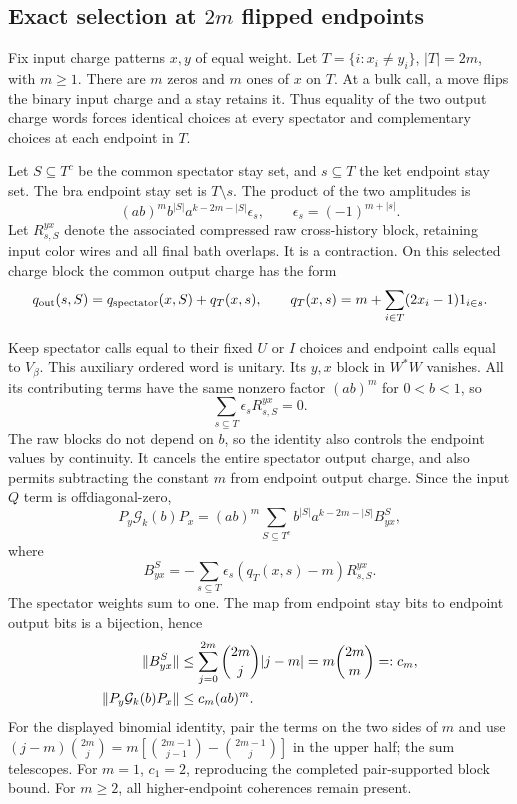 \subsection{Exact selection at $2m$ flipped endpoints}

Fix input charge patterns $x,y$ of equal weight. Let
$T=\{i:x_i\ne y_i\}$, $|T|=2m$, with $m\ge1$.
There are $m$ zeros and $m$ ones of $x$ on $T$.
At a bulk call, a move flips the binary input charge and a stay retains it.
Thus equality of the two output charge words forces identical choices
at every spectator and complementary choices at each endpoint in $T$.

Let $S\subseteq T^c$ be the common spectator stay set, and
$s\subseteq T$ the ket endpoint stay set. The bra endpoint stay set is
$T\setminus s$. The product of the two amplitudes is
\[
 (ab)^m b^{|S|}a^{k-2m-|S|}\epsilon_s,
 \qquad \epsilon_s=(-1)^{m+|s|}.
\]
Let $R_{s,S}^{yx}$ denote the associated compressed raw cross-history
block, retaining input color wires and all final bath overlaps.
It is a contraction. On this selected charge block the common output
charge has the form
\[
 q_{\rm out}(s,S)=q_{\rm spectator}(x,S)+q_T(x,s),
 \qquad
 q_T(x,s)=m+\sum_{i\in T}(2x_i-1)1_{i\in s}.
\]

Keep spectator calls equal to their fixed $U$ or $I$ choices and endpoint
calls equal to $V_\beta$. This auxiliary ordered word is unitary. Its
$y,x$ block in $W^*W$ vanishes. All its contributing terms have the
same nonzero factor $(ab)^m$ for $0<b<1$, so
\begin{equation}\label{eq:hammingunitarity}
 \sum_{s\subseteq T}\epsilon_sR_{s,S}^{yx}=0.
\end{equation}
The raw blocks do not depend on $b$, so the identity also controls the
endpoint values by continuity. It cancels the entire spectator output
charge, and also permits subtracting the constant $m$ from endpoint
output charge. Since the input $Q$ term is offdiagonal-zero,
\[
 P_y\mathcal G_k(b)P_x
 =(ab)^m\sum_{S\subseteq T^c}
       b^{|S|}a^{k-2m-|S|}B_{yx}^S,
\]
where
\[
 B_{yx}^S=-\sum_{s\subseteq T}
        \epsilon_s(q_T(x,s)-m)R_{s,S}^{yx}.
\]
The spectator weights sum to one. The map from endpoint stay bits to
endpoint output bits is a bijection, hence
\begin{align}
 \|B_{yx}^S\|
 &\le \sum_{j=0}^{2m}\binom{2m}{j}|j-m|
 =m\binom{2m}{m}=:c_m,\notag\\
 \|P_y\mathcal G_k(b)P_x\|&\le c_m(ab)^m.
 \label{eq:hammingblock}
\end{align}
For the displayed binomial identity, pair the terms on the two sides of
$m$ and use
$ (j-m)\binom{2m}{j}
=m[\binom{2m-1}{j-1}-\binom{2m-1}{j}]$
in the upper half; the sum telescopes.
For $m=1$, $c_1=2$, reproducing the completed pair-supported block bound.
For $m\ge2$, all higher-endpoint coherences remain present.

